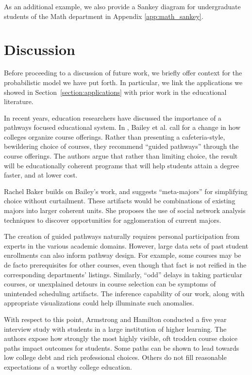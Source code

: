 \documentclass{edm_template}
\begin{document}
As an additional example, we also provide a Sankey diagram for undergraduate students of the Math department in Appendix \ref{app:math_sankey}.
\\
   
\section{Discussion}

Before proceeding to a discussion of future work, we briefly offer context for the probabilistic model we have put forth. In particular, we link the applications we showed in Section~\ref{section:applications} with prior work in the educational literature. 

In recent years, education researchers have discussed the importance of a pathways focused educational system. In \cite{bailey2015redesigning, scott2011shapeless}, Bailey et al. call
for a change in how colleges organize course
offerings. Rather than presenting a cafeteria-style, bewildering
choice of courses, they recommend ``guided pathways'' through the
course offerings. The authors argue that rather than limiting choice,
the result will be educationally coherent programs that will help
students attain a degree faster, and at lower cost.

Rachel Baker \cite{Baker2018} builds on Bailey's work, and suggests
``meta-majors'' for simplifying choice without curtailment. These
artifacts would be combinations of existing majors into larger
coherent units. She proposes the use of social network analysis
techniques to discover opportunities for agglomeration of current
majors.

The creation of guided pathways naturally requires personal
participation from experts in the various academic domains. However,
large data sets of past student enrollments can also inform pathway
design. For example, some courses may be de facto prerequisites for
other courses, even though that fact is not reified in the
corresponding departments' listings. Similarly, ``odd'' delays in taking
particular courses, or unexplained detours in course selection can be
symptoms of unintended scheduling artifacts. The inference capability
of our work, along with appropriate visualizations could help illuminate
such anomalies.

With respect to this point, Armstrong and Hamilton \cite{armstrong2013paying} conducted a five year interview study with students in a large institution of higher learning. The authors expose how strongly the most highly visible, oft trodden course choice paths impact outcomes for students. Some paths can be shown to lead towards low college debt and rich professional choices. Others do not fill reasonable expectations of a worthy college education.
\end{document}
